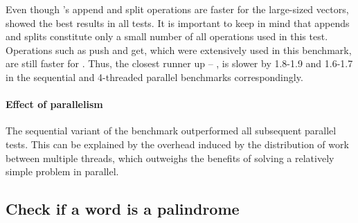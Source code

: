 Even though \rrbvec{}'s append and split operations are faster for the large-sized vectors, \stdvec{} showed the best results in all tests. It is important to keep in mind that appends and splits constitute only a small number of all operations used in this test. Operations such as push and get, which were extensively used in this benchmark, are still faster for \stdvec{}. Thus, the closest runner up -- \pvec{}, is slower by 1.8-1.9 and 1.6-1.7 in the sequential and 4-threaded parallel benchmarks correspondingly.

\paragraph{Effect of parallelism}
The sequential variant of the benchmark outperformed all subsequent parallel tests. This can be explained by the overhead induced by the distribution of work between multiple threads, which outweighs the benefits of solving a relatively simple problem in parallel.

\subsection{Check if a word is a palindrome}

